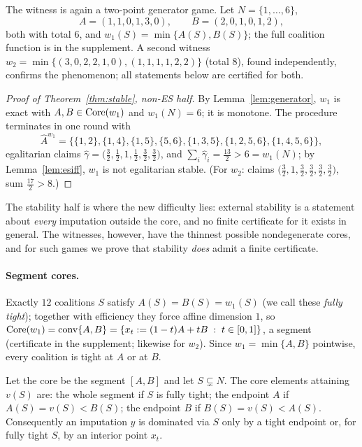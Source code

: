 The witness is again a two-point generator game. Let $N=\{1,\dots,6\}$,
\[
  A=(1,1,0,1,3,0),\qquad B=(2,0,1,0,1,2),
\]
both with total $6$, and $w_1(S)=\min\{A(S),B(S)\}$; the full coalition
function is in the supplement. A second witness
$w_2=\min\{(3,0,2,2,1,0),(1,1,1,1,2,2)\}$ (total $8$), found independently,
confirms the phenomenon; all statements below are certified for both.

\begin{proof}[Proof of Theorem~\ref{thm:stable}, non-ES half]
By Lemma~\ref{lem:generator}, $w_1$ is exact with $A,B\in\operatorname{Core}(w_1)$ and
$w_1(N)=6$; it is monotone. The procedure terminates in one round with
\[
  \widehat A^{w_1}=\bigl\{\{1,2\},\{1,4\},\{1,5\},\{5,6\},\{1,3,5\},
  \{1,2,5,6\},\{1,4,5,6\}\bigr\},
\]
egalitarian claims
$\widehat\gamma=\bigl(\tfrac32,\tfrac12,1,\tfrac12,\tfrac32,\tfrac32\bigr)$,
and $\sum_i\widehat\gamma_i=\tfrac{13}2>6=w_1(N)$; by Lemma~\ref{lem:esiff},
$w_1$ is not egalitarian stable. (For $w_2$: claims
$\bigl(\tfrac32,1,\tfrac32,\tfrac32,\tfrac32,\tfrac32\bigr)$, sum
$\tfrac{17}2>8$.)
\end{proof}

The stability half is where the new difficulty lies: external stability is a
statement about \emph{every} imputation outside the core, and no finite
certificate for it exists in general. The witnesses, however, have the thinnest
possible nondegenerate cores, and for such games we prove that stability
\emph{does} admit a finite certificate.

\paragraph{Segment cores.} Exactly $12$ coalitions $S$ satisfy
$A(S)=B(S)=w_1(S)$ (we call these \emph{fully tight}); together with
efficiency they force affine dimension $1$, so
$\operatorname{Core}(w_1)=\operatorname{conv}\{A,B\}=\{x_t:=(1-t)A+tB\;:\;t\in[0,1]\}$, a
segment (certificate in the supplement; likewise for $w_2$). Since
$w_1=\min\{A,B\}$ pointwise, every coalition is tight at $A$ or at $B$.

\begin{lemma}\label{lem:segdom}
Let the core be the segment $[A,B]$ and let $S\subsetneq N$. The core elements
attaining $v(S)$ are: the whole segment if $S$ is fully tight; the endpoint
$A$ if $A(S)=v(S)<B(S)$; the endpoint $B$ if $B(S)=v(S)<A(S)$. Consequently an
imputation $y$ is dominated via $S$ only by a tight endpoint or, for fully
tight $S$, by an interior point $x_t$.
\end{lemma}

